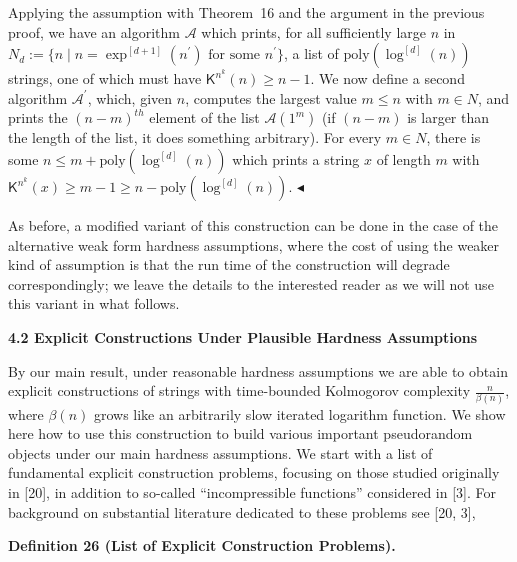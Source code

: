 \documentclass[10pt,a4paper]{article}
\begin{document}
Applying the assumption with Theorem 16 and the argument in the previous proof, we have an algorithm $\mathcal{A}$ which prints, for all sufficiently large $n$ in $N_{d}:=\{n\mid n=\exp^{[d+1]}(n^{\prime})\text{ for some }n^{\prime}\}$, a list of $\mathrm{poly}(\log^{[d]}(n))$ strings, one of which must have ${\mathsf{K}}^{n^{k}}(n)\geq n-1$. We now define a second algorithm $\mathcal{A}^{\prime}$, which, given $n$, computes the largest value $m\leq n$ with $m\in N$, and prints the $(n-m)^{th}$ element of the list $\mathcal{A}(1^{m})$ (if $(n-m)$ is larger than the length of the list, it does something arbitrary). For every $m\in N$, there is some $n\leq m+\mathrm{poly}(\log^{[d]}(n))$ which prints a string $x$ of length $m$ with ${\mathsf{K}}^{n^{k}}(x)\geq m-1\geq n-\mathrm{poly}(\log^{[d]}(n))$.
$\blacktriangleleft$\par




As before, a modified variant of this construction can be done in the case of the alternative weak form hardness assumptions, where the cost of using the weaker kind of assumption is that the run time of the construction will degrade correspondingly; we leave the details to the interested reader as we will not use this variant in what follows.\par






\par\medskip\noindent\textbf{
4.2 Explicit Constructions Under Plausible Hardness Assumptions}\par




By our main result, under reasonable hardness assumptions we are able to obtain explicit constructions of strings with time-bounded Kolmogorov complexity $\frac{n}{\beta(n)}$, where $\beta(n)$ grows like an arbitrarily slow iterated logarithm function. We show here how to use this construction to build various important pseudorandom objects under our main hardness assumptions. We start with a list of fundamental explicit construction problems, focusing on those studied originally in [20], in addition to so-called “incompressible functions” considered in [3]. For background on substantial literature dedicated to these problems see [20, 3],\par





\par\medskip\noindent\textbf{
\textbf{Definition 26}\textbf{ }(List of Explicit Construction Problems)\textbf{.}
}\par
\end{document}
